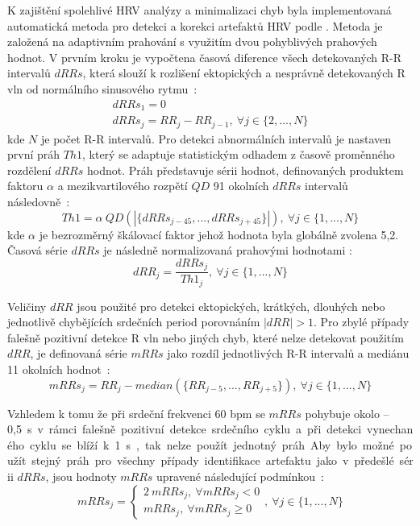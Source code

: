 K zajištění spolehlivé HRV analýzy a minimalizaci chyb byla implementovaná
automatická metoda pro detekci a korekci artefaktů HRV podle
\cite{Lipponen2019}. Metoda je založená na adaptivním prahování s využitím dvou
pohyblivých prahových hodnot. V prvním kroku je vypočtena časová diference všech
detekovaných R-R intervalů $dRRs$, která slouží k rozlišení ektopických a
nesprávně detekovaných R vln od normálního sinusového rytmu~\cite{Lipponen2019}:
\begin{gather}
    dRRs_1 = 0 \nonumber \\
    dRRs_j = RR_j - RR_{j-1}, ~\forall j \in \{2,...,N\}
\end{gather}
kde $N$ je počet R-R intervalů. Pro detekci abnormálních intervalů je nastaven
první práh $Th1$, který se adaptuje statistickým odhadem z časově proměnného
rozdělení $dRRs$ hodnot. Práh představuje sérii hodnot, definovaných produktem
faktoru $\alpha$ a mezikvartilového rozpětí $QD$ 91 okolních $dRRs$ intervalů
následovně~\cite{Lipponen2019}:
\begin{equation}
    Th1 = \alpha~QD(|\{dRRs_{j-45},...,dRRs_{j+45}\}|), ~\forall j \in \{1,...,N\}
\end{equation}
kde $\alpha$ je bezrozměrný škálovací faktor jehož hodnota byla globálně zvolena
5,2. Časová série $dRRs$ je následně normalizovaná prahovými hodnotami
\cite{Lipponen2019}:
\begin{equation}
    dRR_j = \frac{dRRs_j}{Th1_j}, ~\forall j \in \{1,...,N\}
\end{equation}

Veličiny $dRR$ jsou použité pro detekci ektopických, krátkých, dlouhých nebo
jednotlivě chybějících srdečních period porovnáním $|dRR|>1$. Pro zbylé případy
falešně pozitivní detekce R vln nebo jiných chyb, které nelze detekovat použitím
$dRR$, je definovaná série $mRRs$ jako rozdíl jednotlivých R-R intervalů a
mediánu 11 okolních hodnot~\cite{Lipponen2019}:
\begin{equation}
    mRRs_j = RR_j - median(\{RR_{j-5},...,RR_{j+5}\}), ~\forall j \in \{1,...,N\}
\end{equation}

Vzhledem k tomu že při srdeční frekvenci 60 bpm se $mRRs$ pohybuje okolo
--0,5~\si\s~v rámci falešně pozitivní detekce srdečního cyklu a při detekci
vynechaného cyklu se blíží k 1~\si\s, tak nelze použít jednotný práh. Aby bylo
možné použít stejný práh pro všechny případy identifikace artefaktu jako v
předešlé sérii $dRRs$, jsou hodnoty $mRRs$ upravené následující
podmínkou~\cite{Lipponen2019}:
\begin{equation}
    mRRs_j =
    \begin{cases}
        2~mRRs_j, ~\forall mRRs_j < 0 \\
        mRRs_j, ~\forall mRRs_j \geq 0
    \end{cases}
    , ~\forall j \in \{1,...,N\}
\end{equation}


